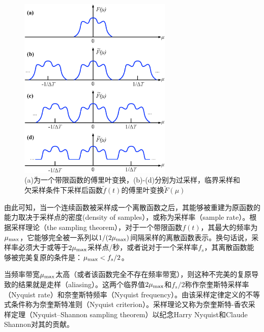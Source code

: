 \begin{figure}
	\sidecaption
	\includegraphics[width=0.65\textwidth]{figures/intro/sampling-aliasing}
	\caption{(a)为一个带限函数的傅里叶变换，(b)-(d)分别为过采样，临界采样和欠采样条件下采样后函数$\tilde{f}(t)$的傅里叶变换$\tilde{F}(\mu)$}
	\label{f:intro-sampling-aliasing}
\end{figure}

由此可知，当一个连续函数被采样成一个离散函数之后，其能够被重建为原函数的能力取决于采样点的密度(density of samples），或称为采样率（sample rate）。根据采样理论（the sampling theorem），对于一个带限函数$f(t)$，其最大的频率为$\mu_{\rm max}$，它能够完全被一系列以$1/(2\mu_{\rm max})$间隔采样的离散函数表示。换句话说，采样率必须大于或等于$2\mu_{\rm max}$采样点/秒，或者说对于一个采样率$f_s$，其离散函数能够被完美复原的条件是：$\mu_{\rm max}<f_s/2$。

当频率带宽$\mu_{\rm max}$太高（或者该函数完全不存在频率带宽），则这种不完美的复原导致的结果就是走样（aliasing）。这两个临界值$2\mu_{\rm max}$和$f_s/2$称作奈奎斯特采样率（Nyquist rate）和奈奎斯特频率（Nyquist frequency）。由该采样定律定义的不等式条件称为奈奎斯特准则（Nyquist criterion）。采样理论又称为奈奎斯特-香农采样定理（Nyquist–Shannon sampling theorem）以纪念Harry Nyquist和Claude Shannon对其的贡献。 

